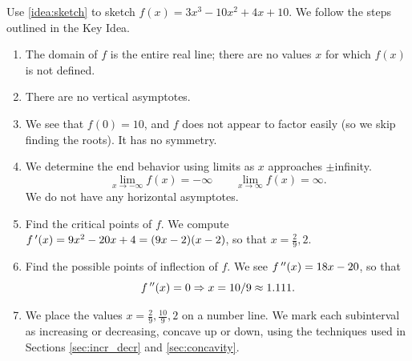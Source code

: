 \begin{example}\label{ex_sketch1}%
Use \autoref{idea:sketch} to sketch $f(x) = 3x^3-10x^2+4x+10$.
\solution
We follow the steps outlined in the Key Idea.
\begin{enumerate}
	\item	The domain of $f$ is the entire real line; there are no values $x$ for which $f(x)$ is not defined.
	\item	There are no vertical asymptotes.
	\item	We see that $f(0)=10$, and $f$ does not appear to factor easily (so we skip finding the roots).  It has no symmetry.
	\item	We determine the end behavior using limits as $x$ approaches $\pm$infinity.			\[\lim_{x\to-\infty}f(x)=-\infty\qquad\lim_{x\to\infty}f(x)=\infty.\]
		We do not have any horizontal asymptotes.
	\item	Find the critical points of $f$. We compute $f\,'(x) = 9x^2-20x+4=(9x-2)(x-2)$, so that $x=\frac29,2$.
	\item	Find the possible points of inflection of $f$. We see $f\,''(x) = 18x-20$, so that
	\[f\,''(x) = 0 \Rightarrow x= 10/9 \approx 1.111.\]
	\item	We place the values $x=\frac29,\frac{10}9,2$ on a number line. We mark each subinterval as increasing or decreasing, concave up or down, using the techniques used in Sections \ref{sec:incr_decr} and \ref{sec:concavity}.


\end{enumerate}
\end{example}

